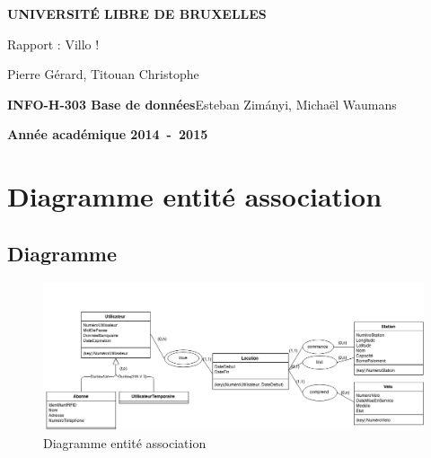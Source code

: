 \documentclass[a4paper,10pt]{report}
\begin{document}
\begin{titlepage}
\begin{center}
\textbf{\textsc{UNIVERSIT\'E LIBRE DE BRUXELLES}}\\
\vfill{}\vfill{}
\begin{center}{\Huge Rapport : Villo !}\end{center}{\Huge \par}
\begin{center}{\large Pierre Gérard, Titouan Christophe}\end{center}{\Huge \par}
\vfill{}\vfill{} \vfill{}
\begin{flushleft}{\large \textbf{INFO-H-303 Base de données}}\hfill{Esteban Zimányi, Michaël Waumans}\end{flushleft}{\large\par}
\vfill{}\vfill{}\enlargethispage{3cm}
\textbf{Année académique 2014~-~2015}
\end{center}
\end{titlepage}



\tableofcontents


\chapter{Diagramme entité association}
\section{Diagramme}
\begin{figure}[hbt]
  \includegraphics[scale=0.4]{dia/diagramme-entite-association.png}
  \caption{Diagramme entité association
}
\end{figure}
\end{document}
